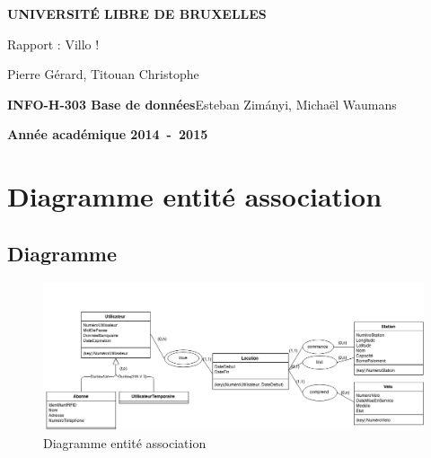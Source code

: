 \documentclass[a4paper,10pt]{report}
\begin{document}
\begin{titlepage}
\begin{center}
\textbf{\textsc{UNIVERSIT\'E LIBRE DE BRUXELLES}}\\
\vfill{}\vfill{}
\begin{center}{\Huge Rapport : Villo !}\end{center}{\Huge \par}
\begin{center}{\large Pierre Gérard, Titouan Christophe}\end{center}{\Huge \par}
\vfill{}\vfill{} \vfill{}
\begin{flushleft}{\large \textbf{INFO-H-303 Base de données}}\hfill{Esteban Zimányi, Michaël Waumans}\end{flushleft}{\large\par}
\vfill{}\vfill{}\enlargethispage{3cm}
\textbf{Année académique 2014~-~2015}
\end{center}
\end{titlepage}



\tableofcontents


\chapter{Diagramme entité association}
\section{Diagramme}
\begin{figure}[hbt]
  \includegraphics[scale=0.4]{dia/diagramme-entite-association.png}
  \caption{Diagramme entité association
}
\end{figure}
\end{document}
